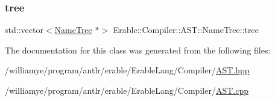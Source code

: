 \mbox{\label{class_erable_1_1_compiler_1_1_a_s_t_1_1_name_tree_aa5535b40b2cac012da11e76e99450959}} 
\subsubsection{\texorpdfstring{tree}{tree}}
{\footnotesize\ttfamily std\+::vector$<$\mbox{\hyperlink{class_erable_1_1_compiler_1_1_a_s_t_1_1_name_tree}{Name\+Tree}} $\ast$$>$ Erable\+::\+Compiler\+::\+A\+S\+T\+::\+Name\+Tree\+::tree\hspace{0.3cm}{\ttfamily [protected]}}



The documentation for this class was generated from the following files\+:\begin{DoxyCompactItemize}
\item 
/williamye/program/antlr/erable/\+Erable\+Lang/\+Compiler/\mbox{\hyperlink{_a_s_t_8hpp}{A\+S\+T.\+hpp}}\item 
/williamye/program/antlr/erable/\+Erable\+Lang/\+Compiler/\mbox{\hyperlink{_a_s_t_8cpp}{A\+S\+T.\+cpp}}\end{DoxyCompactItemize}
